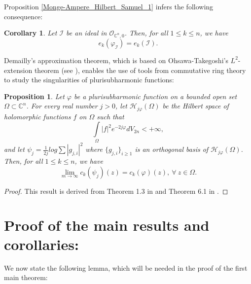 \documentclass[a4paper,oneside,reqno,11pt]{article}
\newtheorem{proposition}[theorem]{Proposition}
\newtheorem{corollary}[theorem]{Corollary}
\begin{document}
Proposition \ref{Monge-Ampere_Hilbert_Samuel_1} infers the following consequence:

\begin{corollary}\label{Monge-Ampere_Hilbert_Samuel_2} Let $\mathcal I$ be an ideal in $\mathcal O_{ \mathbb C^n, 0}$. Then, for all $1\leq k\leq n$, we have
$$e_k ( \varphi_{\mathcal I} ) = e_k ( \mathcal I ).$$
\end{corollary}

Demailly's approximation theorem, which is based on Ohsawa-Takegoshi's $L^2$-extension theorem (see \cite{OT87}), enables the use of tools from commutative ring theory to study the singularities of plurisubharmonic functions:

\begin{proposition}\label{Demailly_approximation} Let $\varphi$ be a plurisubharmonic function on a bounded open set $\Omega\subset\mathbb{C}^n$. For every real number $j>0$, let $\mathcal{H}_{j\varphi}(\Omega)$ be the Hilbert space of holomorphic functions $f$ on $\Omega$ such that 
$$\int\limits_{\Omega} |f|^2e^{-2j\varphi} dV_{2n}<+\infty,$$ 
and let $\psi_j=\frac{1}{2j}log\sum|g_{j,i}|^2$ where $\{ g_{j,i} \}_{ i\geq 1 }$ is an orthogonal basis of $\mathcal{H}_{j\varphi}(\Omega)$. Then, for all $1\leq k\leq n$, we have  
$$\lim\limits_{m\to\infty} c_k ( \psi_j ) ( z ) = c_k ( \varphi ) ( z ),\ \forall\ z\in\Omega .$$
\end{proposition}

\begin{proof} 
This result is derived from Theorem 1.3 in \cite{Hi17} and Theorem 6.1 in \cite{HHT21}.
\end{proof}

\section{Proof of the main results and corollaries:}

We now state the following lemma, which will be needed in the proof of the first main theorem:
\end{document}
